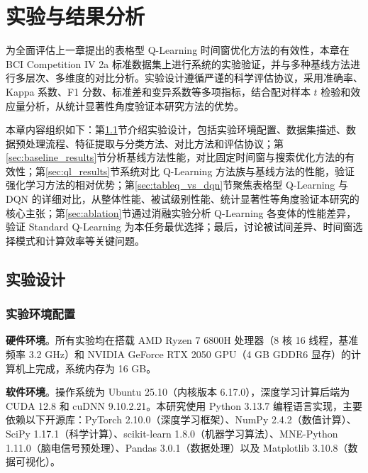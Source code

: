 
\chapter{实验与结果分析}
\label{chap:experiments}

为全面评估上一章提出的表格型 Q-Learning 时间窗优化方法的有效性，本章在 BCI Competition IV 2a 标准数据集上进行系统的实验验证，并与多种基线方法进行多层次、多维度的对比分析。实验设计遵循严谨的科学评估协议，采用准确率、Kappa 系数、F1 分数、标准差和变异系数等多项指标，结合配对样本 $t$ 检验和效应量分析，从统计显著性角度验证本研究方法的优势。

本章内容组织如下：第\ref{sec:exp_design}节介绍实验设计，包括实验环境配置、数据集描述、数据预处理流程、特征提取与分类方法、对比方法和评估协议；第\ref{sec:baseline_results}节分析基线方法性能，对比固定时间窗与搜索优化方法的有效性；第\ref{sec:ql_results}节系统对比 Q-Learning 方法族与基线方法的性能，验证强化学习方法的相对优势；第\ref{sec:tableq_vs_dqn}节聚焦表格型 Q-Learning 与 DQN 的详细对比，从整体性能、被试级别性能、统计显著性等角度验证本研究的核心主张；第\ref{sec:ablation}节通过消融实验分析 Q-Learning 各变体的性能差异，验证 Standard Q-Learning 为本任务最优选择；最后，讨论被试间差异、时间窗选择模式和计算效率等关键问题。

\section{实验设计}
\label{sec:exp_design}

\subsection{实验环境配置}
\label{subsec:experimental_setup}

\textbf{硬件环境}。所有实验均在搭载 AMD Ryzen 7 6800H 处理器（8 核 16 线程，基准频率 3.2 GHz）和 NVIDIA GeForce RTX 2050 GPU（4 GB GDDR6 显存）的计算机上完成，系统内存为 16 GB。

\textbf{软件环境}。操作系统为 Ubuntu 25.10（内核版本 6.17.0），深度学习计算后端为 CUDA 12.8 和 cuDNN 9.10.2.21。本研究使用 Python 3.13.7 编程语言实现，主要依赖以下开源库：PyTorch 2.10.0（深度学习框架）、NumPy 2.4.2（数值计算）、SciPy 1.17.1（科学计算）、scikit-learn 1.8.0（机器学习算法）、MNE-Python 1.11.0（脑电信号预处理）、Pandas 3.0.1（数据处理）以及 Matplotlib 3.10.8（数据可视化）。

